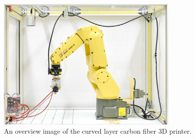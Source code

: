 \begin{figure}[h!]
\centering
\includegraphics[width=0.8\textwidth]{./figures/poster-image}
\caption{An overview image of the curved layer carbon fiber 3D printer.}
\label{fig:poster-image}
\end{figure}


